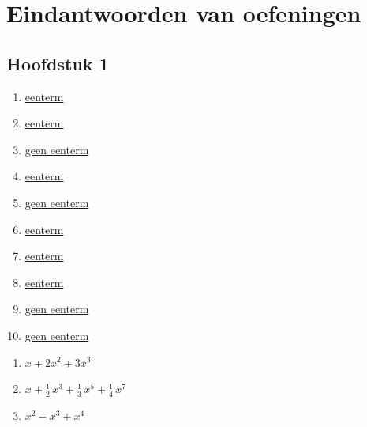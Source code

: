 \documentclass{ximera}
\begin{document}
	\author{Koen De Naeghel - Wiskunde Op Maat}
    \xmsource
	\label{xim:veeltermen_eindantwoorden}
\chapter{Eindantwoorden van oefeningen}
\section*{Hoofdstuk 1}

\begin{Antwoord} \label{antw1.1}
\begin{enumerate}

\item
\hyperlink{oef1.1}{eenterm}
\item
\hyperlink{oef1.1}{eenterm}
\item
\hyperlink{oef1.1}{geen eenterm}
\item
\hyperlink{oef1.1}{eenterm}
\item
\hyperlink{oef1.1}{geen eenterm}
\item
\hyperlink{oef1.1}{eenterm}
\item\hyperlink{oef1.1}{eenterm}
\item
\hyperlink{oef1.1}{eenterm}
\item
\hyperlink{oef1.1}{geen eenterm}
\item
\hyperlink{oef1.1}{geen eenterm}
\end{enumerate}
\end{Antwoord}

\begin{Antwoord} \label{antw1.2}
\begin{enumerate}
\item
\hyperlink{oef1.2}{$x + 2x^2 + 3x^3$}
\item
\hyperlink{oef1.2}{$x + \frac{1}{2}\,x^3 + \frac{1}{3}\,x^5 + \frac{1}{4}\,x^7$}
\item
\hyperlink{oef1.2}{$x^2 - x^3 + x^4$}
\end{enumerate}
\end{Antwoord}
\end{document}

